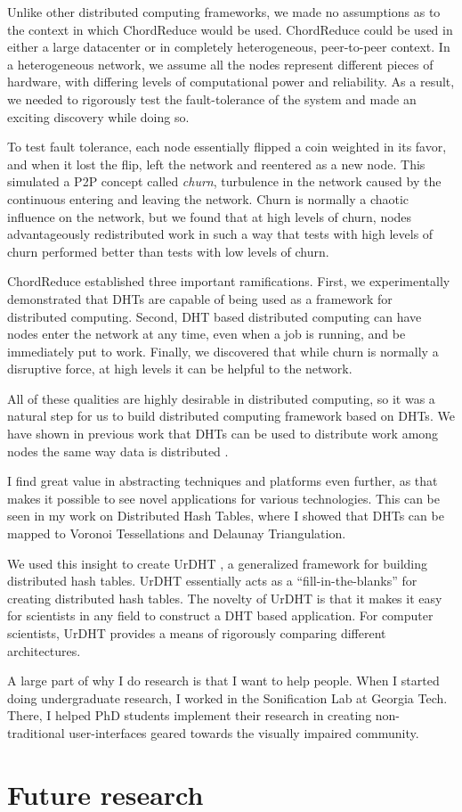 \documentclass[10pt, a4paper]{article}
\begin{document}
Unlike other distributed computing frameworks, we made no assumptions as to the context in which ChordReduce would be used.
ChordReduce could be used in either a large datacenter or in completely heterogeneous, peer-to-peer context.
In a heterogeneous network, we assume all the nodes represent different pieces of hardware, with differing levels of computational power and reliability.
As a result, we needed to rigorously test the fault-tolerance of the system and made an exciting discovery while doing so.

To test fault tolerance, each node essentially flipped a coin weighted in its favor, and when it lost the flip, left the network and reentered as a new node.
This simulated a P2P concept called \textit{churn}, turbulence in the network caused by the continuous entering and leaving the network.
Churn is normally a chaotic influence on the network, but we found that at high levels of churn, nodes advantageously redistributed work in such a way that tests with high levels of churn performed better than tests with low levels of churn.

ChordReduce established three important ramifications.
First, we experimentally demonstrated that DHTs are capable of being used as a framework for distributed computing.
Second, DHT based distributed computing can have nodes enter the network at any time, even when a job is running, and be immediately put to work.
Finally, we discovered that while churn is normally a disruptive force, at high levels it can be helpful to the network.

All of these qualities are highly desirable in distributed computing, so it was a natural step for us to build distributed computing framework based on DHTs.
We have shown in previous work that DHTs can be used to distribute work among nodes the same way data is distributed \cite{chordreduce}.



I find great value in abstracting techniques and platforms even further, as that makes it possible to see novel applications for various technologies.  
This can be seen in my work on Distributed Hash Tables, where I showed that DHTs can be mapped to Voronoi Tessellations and Delaunay Triangulation.


We used this insight to create UrDHT \cite{urdht}, a generalized framework for building distributed hash tables.
UrDHT essentially acts as a ``fill-in-the-blanks'' for creating  distributed hash tables.
The novelty of UrDHT is that it makes it easy for scientists in any field to construct a DHT based application.
For computer scientists, UrDHT provides a means of rigorously comparing different architectures.


A large part of why I do research is that I want to help people.
When I started doing undergraduate research, I worked in the Sonification Lab at Georgia Tech.
There, I helped PhD students implement their research in creating  non-traditional user-interfaces geared towards the visually impaired community.



\section{Future research}
\end{document}
